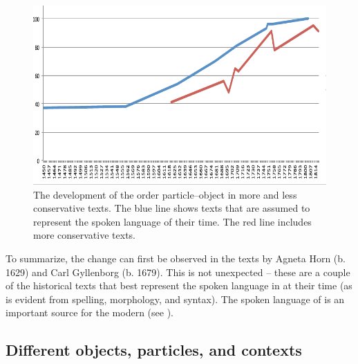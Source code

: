 \documentclass[output=paper]{langscibook}
\begin{document}
  
\begin{figure}
\includegraphics[width=\textwidth]{figures/a4-img002.pdf}
\caption{The development of the order particle–object in more and less conservative texts. The blue line shows texts that are assumed to represent the spoken language of their time. The red line includes more conservative texts.\label{fig:lalu:2}} 
\end{figure}


To summarize, the change can first be observed in the texts by Agneta Horn (b. 1629) and Carl Gyllenborg (b. 1679). This is not unexpected – these are a couple of the historical texts that best represent the spoken language in  at their time (as is evident from spelling, morphology, and syntax). The spoken language of  is an important source for the modern   (see ). 


\subsection{Different objects, particles, and contexts}\label{sec:lalu:5.2}
\end{document}
